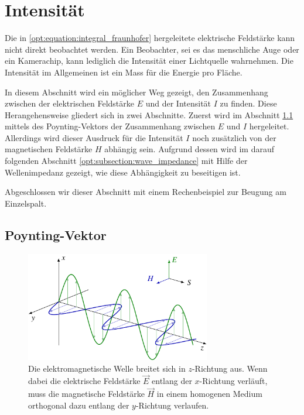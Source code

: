 %
%
%
%
\section{Intensität\label{opt:sec:intensity}}

Die in \eqref{opt:equation:integral_fraunhofer} hergeleitete elektrische Feldstärke kann nicht direkt beobachtet werden.
Ein Beobachter, sei es das menschliche Auge oder ein Kamerachip, kann lediglich die Intensität einer Lichtquelle wahrnehmen.
%
Die Intensität im Allgemeinen ist ein Mass für die Energie pro Fläche.

In diesem Abschnitt wird ein möglicher Weg gezeigt, den Zusammenhang zwischen der elektrischen Feldstärke $E$ und der Intensität $I$ zu finden.
Diese Herangehensweise gliedert sich in zwei Abschnitte.
Zuerst wird im Abschnitt \ref{opt:subsection:poynting_vector} mittels des Poynting-Vektors der Zusammenhang zwischen $E$ und $I$ hergeleitet.
Allerdings wird dieser Ausdruck für die Intensität $I$ noch zusätzlich von der magnetischen Feldstärke $H$ abhängig sein.
Aufgrund dessen wird im darauf folgenden Abschnitt \ref{opt:subsection:wave_impedance} mit Hilfe der Wellenimpedanz gezeigt, wie diese Abhängigkeit zu beseitigen ist.

Abgeschlossen wir dieser Abschnitt mit einem Rechenbeispiel zur Beugung am Einzelspalt.

\subsection{Poynting-Vektor}
\label{opt:subsection:poynting_vector}
%
\begin{figure}
    \centering
    \includegraphics[width=80.63mm]{papers/opt/images/electromagnetic_wave_1.pdf}
    \caption{Die elektromagnetische Welle breitet sich in $z$-Richtung aus. 
    Wenn dabei die elektrische Feldstärke $\vec{E}$ entlang der $x$-Richtung verläuft, muss die magnetische Feldstärke $\vec{H}$ 
    in einem homogenen Medium orthogonal dazu entlang der $y$-Richtung verlaufen.}
    \label{opt:fig:electromagnetic_wave_1}
\end{figure}

